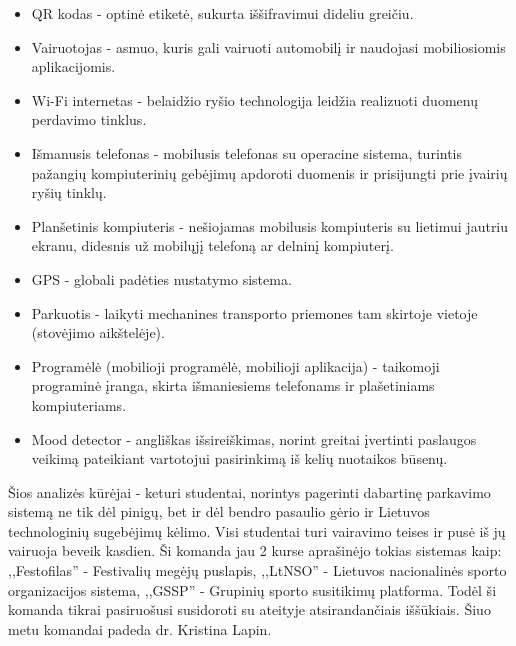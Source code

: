 \documentclass{VUMIFPSkursinis}
\begin{document}
\begin{itemize}
	\item QR kodas - optinė etiketė, sukurta iššifravimui dideliu greičiu.
	\item Vairuotojas - asmuo, kuris gali vairuoti automobilį ir naudojasi mobiliosiomis aplikacijomis.
	\item Wi-Fi internetas - belaidžio ryšio technologija leidžia realizuoti duomenų perdavimo tinklus.
	\item Išmanusis telefonas - mobilusis telefonas su operacine sistema, turintis pažangių kompiuterinių gebėjimų apdoroti duomenis ir prisijungti prie įvairių ryšių tinklų.
	\item Planšetinis kompiuteris - nešiojamas mobilusis kompiuteris su lietimui jautriu ekranu, didesnis už mobilųjį telefoną ar delninį kompiuterį.
	\item GPS - globali padėties nustatymo sistema.
	\item Parkuotis - laikyti mechanines transporto priemones tam skirtoje vietoje (stovėjimo aikštelėje).
	\item Programėlė (mobilioji programėlė, mobilioji aplikacija) - taikomoji programinė įranga, skirta išmaniesiems telefonams ir plašetiniams kompiuteriams.
	\item Mood detector - angliškas išsireiškimas, norint greitai įvertinti paslaugos veikimą pateikiant vartotojui pasirinkimą iš kelių nuotaikos būsenų.
\end{itemize}


	Šios analizės kūrėjai - keturi studentai, norintys pagerinti dabartinę parkavimo sistemą ne tik dėl pinigų, bet ir dėl bendro pasaulio gėrio ir Lietuvos technologinių sugebėjimų kėlimo. Visi studentai turi vairavimo teises ir pusė iš jų vairuoja beveik kasdien. Ši komanda jau 2 kurse aprašinėjo tokias sistemas kaip: ,,Festofilas'' - Festivalių megėjų puslapis, ,,LtNSO'' - Lietuvos nacionalinės sporto organizacijos sistema, ,,GSSP'' - Grupinių sporto susitikimų platforma. Todėl ši komanda tikrai pasiruošusi susidoroti su ateityje atsirandančiais iššūkiais. Šiuo metu komandai padeda dr. Kristina Lapin.
\end{document}
